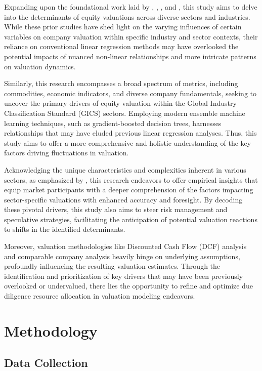 \documentclass[12pt,a4paper,english]{article}
\begin{document}
Expanding upon the foundational work laid by , , , and , this study aims to delve into the determinants of equity valuations across diverse sectors and industries. While these prior studies have shed light on the varying influences of certain variables on company valuation within specific industry and sector contexts, their reliance on conventional linear regression methods may have overlooked the potential impacts of nuanced non-linear relationships and more intricate patterns on valuation dynamics.


Similarly, this research encompasses a broad spectrum of metrics, including commodities, economic indicators, and diverse company fundamentals, seeking to uncover the primary drivers of equity valuation within the Global Industry Classification Standard (GICS) sectors. Employing modern ensemble machine learning techniques, such as gradient-boosted decision trees, harnesses relationships that may have eluded previous linear regression analyses. Thus, this study aims to offer a more comprehensive and holistic understanding of the key factors driving fluctuations in valuation.

Acknowledging the unique characteristics and complexities inherent in various sectors, as emphasized by , this research endeavors to offer empirical insights that equip market participants with a deeper comprehension of the factors impacting sector-specific valuations with enhanced accuracy and foresight. By decoding these pivotal drivers, this study also aims to steer risk management and speculative strategies, facilitating the anticipation of potential valuation reactions to shifts in the identified determinants.

Moreover, valuation methodologies like Discounted Cash Flow (DCF) analysis and comparable company analysis heavily hinge on underlying assumptions, profoundly influencing the resulting valuation estimates. Through the identification and prioritization of key drivers that may have been previously overlooked or undervalued, there lies the opportunity to refine and optimize due diligence resource allocation in valuation modeling endeavors.

\section{Methodology}

\subsection{Data Collection}
\end{document}
